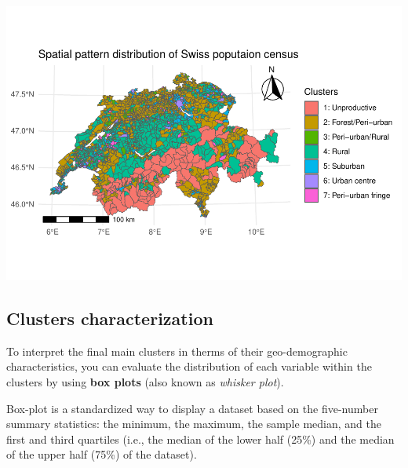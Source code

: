 \documentclass[
]{book}
\begin{document}
\includegraphics{05-SOM_files/figure-latex/mapping the clusters-1.pdf}

\hypertarget{clusters-characterization}{%
\subsection{Clusters characterization}\label{clusters-characterization}}

To interpret the final main clusters in therms of their geo-demographic characteristics, you can evaluate the distribution of each variable within the clusters by using \textbf{box plots} (also known as \emph{whisker plot}).

Box-plot is a standardized way to display a dataset based on the five-number summary statistics: the minimum, the maximum, the sample median, and the first and third quartiles (i.e., the median of the lower half (25\%) and the median of the upper half (75\%) of the dataset).
\end{document}

